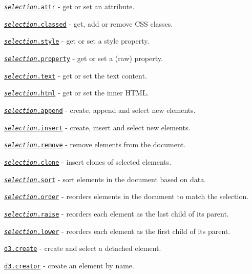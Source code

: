 \begin{DoxyItemize}
\item \href{https://github.com/d3/d3-selection/blob/master/README.md#selection_attr}{\tt {\itshape selection}.attr} -\/ get or set an attribute.
\item \href{https://github.com/d3/d3-selection/blob/master/README.md#selection_classed}{\tt {\itshape selection}.classed} -\/ get, add or remove C\+SS classes.
\item \href{https://github.com/d3/d3-selection/blob/master/README.md#selection_style}{\tt {\itshape selection}.style} -\/ get or set a style property.
\item \href{https://github.com/d3/d3-selection/blob/master/README.md#selection_property}{\tt {\itshape selection}.property} -\/ get or set a (raw) property.
\item \href{https://github.com/d3/d3-selection/blob/master/README.md#selection_text}{\tt {\itshape selection}.text} -\/ get or set the text content.
\item \href{https://github.com/d3/d3-selection/blob/master/README.md#selection_html}{\tt {\itshape selection}.html} -\/ get or set the inner H\+T\+ML.
\item \href{https://github.com/d3/d3-selection/blob/master/README.md#selection_append}{\tt {\itshape selection}.append} -\/ create, append and select new elements.
\item \href{https://github.com/d3/d3-selection/blob/master/README.md#selection_insert}{\tt {\itshape selection}.insert} -\/ create, insert and select new elements.
\item \href{https://github.com/d3/d3-selection/blob/master/README.md#selection_remove}{\tt {\itshape selection}.remove} -\/ remove elements from the document.
\item \href{https://github.com/d3/d3-selection/blob/master/README.md#selection_clone}{\tt {\itshape selection}.clone} -\/ insert clones of selected elements.
\item \href{https://github.com/d3/d3-selection/blob/master/README.md#selection_sort}{\tt {\itshape selection}.sort} -\/ sort elements in the document based on data.
\item \href{https://github.com/d3/d3-selection/blob/master/README.md#selection_order}{\tt {\itshape selection}.order} -\/ reorders elements in the document to match the selection.
\item \href{https://github.com/d3/d3-selection/blob/master/README.md#selection_raise}{\tt {\itshape selection}.raise} -\/ reorders each element as the last child of its parent.
\item \href{https://github.com/d3/d3-selection/blob/master/README.md#selection_lower}{\tt {\itshape selection}.lower} -\/ reorders each element as the first child of its parent.
\item \href{https://github.com/d3/d3-selection/blob/master/README.md#create}{\tt d3.\+create} -\/ create and select a detached element.
\item \href{https://github.com/d3/d3-selection/blob/master/README.md#creator}{\tt d3.\+creator} -\/ create an element by name.
\end{DoxyItemize}

